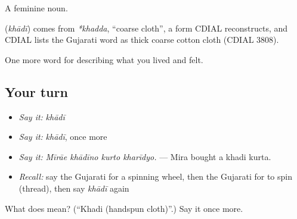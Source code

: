 A feminine noun.

\begin{cousinweb}
\textbf{} (\emph{khādī}) comes from \emph{*khadda}, \textquotedblleft{}coarse cloth\textquotedblright{}, a form CDIAL reconstructs, and CDIAL lists the Gujarati word as thick coarse cotton cloth (CDIAL 3808).
\end{cousinweb}

\begin{grammarlens}[title={What you've built}]
One more word for describing what you lived and felt.
\end{grammarlens}

\subsection*{Your turn}
\begin{itemize}
\raggedright
  \item \emph{Say it:} \emph{khādī}
  \item \emph{Say it:} \emph{khādī}, once more
  \item \emph{Say it:} \emph{Mīrāe khādīno kurto kharīdyo.} — Mira bought a khadi kurta.
  \item \emph{Recall:} say the Gujarati for a spinning wheel, then the Gujarati for to spin (thread), then say \emph{khādī} again
\end{itemize}

\begin{tcolorbox}[breakable,colback=teal!4,colframe=teal!35!black,title={Before you move on}]
What does  mean? (\textquotedblleft{}Khadi (handspun cloth)\textquotedblright{}.) Say it once more.
\end{tcolorbox}
